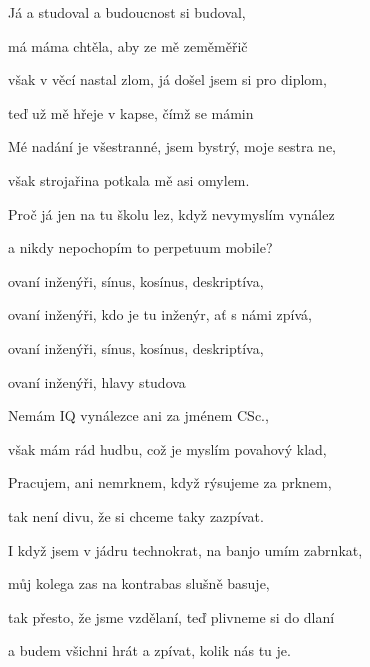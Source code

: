 

\zs
Já  a studoval a budoucnost si budoval,

má máma chtěla, aby ze mě zeměměřič 

však v  věcí nastal zlom, já došel jsem si pro diplom,

teď už mě hřeje v kapse, čímž se  mámin  
\ks

\zs
Mé nadání je všestranné, jsem bystrý, moje sestra ne,

však strojařina potkala mě asi omylem.

Proč já jen na tu školu lez, když nevymyslím vynález

a nikdy nepochopím to perpetuum mobile?
\ks

\zr
{}ovaní inženýři, sínus, kosínus, deskriptíva,

ovaní inženýři, kdo je tu inženýr, ať s námi zpívá,

ovaní inženýři, sínus, kosínus, deskriptíva,

ovaní inženýři, hlavy studova
\kr

\zs
Nemám IQ vynálezce ani za jménem CSc.,

však mám rád hudbu, což je myslím povahový klad,

Pracujem, ani nemrknem, když rýsujeme za prknem,

tak není divu, že si chceme taky zazpívat.
\ks

\zs
I když jsem v jádru technokrat,
na banjo umím zabrnkat,

můj kolega zas na kontrabas slušně basuje,

tak přesto, že jsme vzdělaní, teď plivneme si do dlaní

a budem všichni hrát a zpívat, kolik nás tu je.
\ks

\zr  \kr

\kp






















